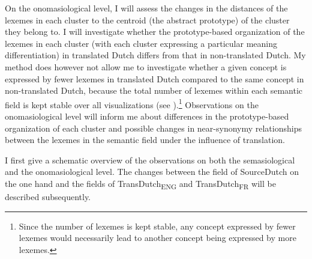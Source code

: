 On the onomasiological level, I will assess the changes in the distances of the lexemes in each cluster to the centroid (the abstract prototype) of the cluster they belong to. I will investigate whether the prototype-based organization of the lexemes in each cluster (with each cluster expressing a particular meaning differentiation) in translated Dutch differs from that in non-translated Dutch. My method does however not allow me to investigate whether a given concept is expressed by fewer lexemes in translated Dutch compared to the same concept in non-translated Dutch, because the total number of lexemes within each semantic field is kept stable over all visualizations (see ).\footnote{Since the number of lexemes is kept stable, any concept expressed by fewer lexemes would necessarily lead to another concept being expressed by more lexemes.} Observations on the onomasiological level will inform me about differences in the prototype-based organization of each cluster and possible changes in near-synonymy relationships between the lexemes in the semantic field under the influence of translation.

I first give a schematic overview of the observations on both the semasiological and the onomasiological level. The changes between the field of SourceDutch on the one hand and the fields of TransDutch\textsubscript{ENG} and TransDutch\textsubscript{FR} will be described subsequently.


